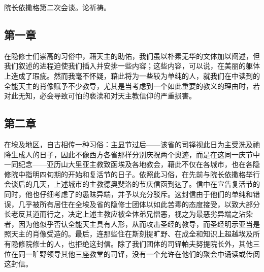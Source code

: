 \par

院长依撒格第二次会谈。论祈祷。\par


\subsection{第一章}

\par

在隐修士们崇高的习俗中，藉天主的助佑，我们虽以朴素无华的文体加以阐述，但我们叙述的进程迫使我们插入并安排一些内容；这些内容，可以说，在美丽的躯体上造成了瑕疵。然而我毫不怀疑，藉此将为一些较为单纯的人，就我们在中读到的全能天主的肖像赋予不少教导，尤其是当考虑到一个如此重要的教义的理由时，若对此无知，必会导致可怕的亵渎和对天主教信仰的严重损害。\par


\subsection{第二章}

\par

在埃及地区，自古相传一种习俗：主显节过后——该省的司铎视此日为主受洗及祂降生成人的日子，因此不像西方各省那样分别庆祝两个奥迹，而是在这同一庆节中一同纪念——亚历山大里亚主教致函埃及各地教会，藉此不仅在各城市，也在各隐修院中指明四旬期的开始和复活节的日子。依照此习俗，在先前与院长依撒格举行会谈后的几天，上述城市的主教德奥斐洛的节庆信函到达了。信中在宣告复活节的同时，他也仔细考虑了的愚昧异端，并予以充分驳斥。这封信由于他们的单纯和错误，几乎被所有居住在全埃及省的隐修士团体以如此苦毒的态度接受，以致大部分长老反其道而行之，决定上述主教应被全体弟兄憎恶，视之为最恶劣异端之沾染者，因为他似乎否认全能天主具有人形，从而攻击圣经的教导，而圣经明示亚当是照天主的肖像受造的。最后，连那些住在斯刻提旷野、在成全和知识上超越埃及所有隐修院修士的人，也拒绝这封信。除了我们团体的司铎帕夫努提院长外，其他三位在同一旷野领导其他三座教堂的司铎，没有一个允许在他们的聚会中诵读或传阅这封信。\par


